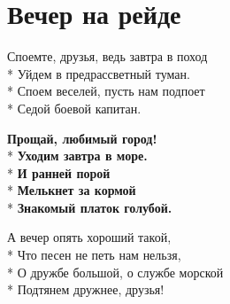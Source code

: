 \vspace{\fill}\newpage

\section{Вечер на рейде}
\label{song:Вечер_на_рейде}

\medskip

\begin{minipage}{\linewidth}
Споемте, друзья, ведь завтра в поход\\*
Уйдем в предрассветный туман.\\*
Споем веселей, пусть нам подпоет\\*
Седой боевой капитан.\\
\end{minipage}\par\medskip\nobreak

\medskip

\begin{minipage}{\linewidth}
\hspace*{1.5em}\textbf{Прощай, любимый город!}\\*
\hspace*{1.5em}\textbf{Уходим завтра в море.}\\*
\hspace*{1.5em}\textbf{И ранней порой}\\*
\hspace*{1.5em}\textbf{Мелькнет за кормой}\\*
\hspace*{1.5em}\textbf{Знакомый платок голубой.}\\
\end{minipage}\par\medskip\nobreak

\medskip

\begin{minipage}{\linewidth}
А вечер опять хороший такой,\\*
Что песен не петь нам нельзя,\\*
О дружбе большой, о службе морской\\*
Подтянем дружнее, друзья!\\
\end{minipage}\par\medskip\nobreak

\medskip

